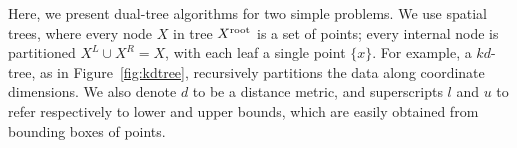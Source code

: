 \documentclass{article}
\newcommand{\spos}{^{{\scriptscriptstyle +\!}}}
\newcommand{\sneg}{^{{\scriptscriptstyle -\!}}}
\newcommand{\kdroot}[1]{#1^{\text{\rm root}}}
\newcommand{\kdleft}[1]{#1^{\!L}}
\newcommand{\kdright}[1]{#1^{\!R}}
\newcommand{\al}{a^l}
\newcommand{\au}{a^u}
\newcommand{\dl}{d^l}
\newcommand{\du}{d^u}
\newcommand{\x}{\\ \hspace{0.13in} \scriptstyle}
\newcommand{\xx}{\\ \hspace{0.26in} \scriptstyle}
\begin{document}
\begin{figure}
\begin{minipage}{3.88in}
  \end{minipage}
  \vspace{-.2in}
\end{figure}
Here, we present dual-tree algorithms for two simple problems.
We use spatial trees, where every node $X$ in tree $\kdroot{X}$ is a set of points; every internal node is partitioned $\kdleft{X} \cup \kdright{X} = X$, with each leaf a single point $\{x\}$.
For example, a $kd$-tree\cite{kde-uai-dong}, as in Figure~\ref{fig:kdtree}, recursively partitions the data along coordinate dimensions.
We also denote $d$ to be a distance metric, and superscripts $l$ and $u$ to refer respectively to lower and upper bounds, which are easily obtained from bounding boxes of points.
\end{document}
